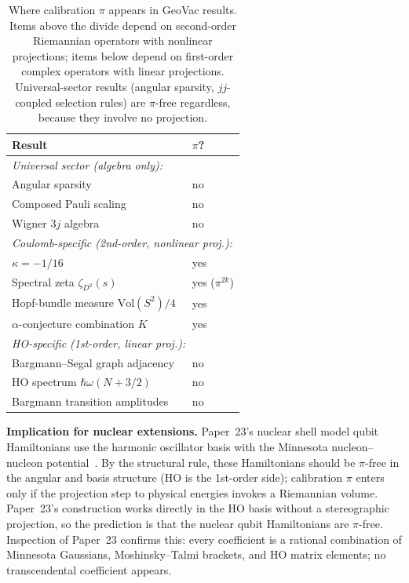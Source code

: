 \documentclass[twocolumn,pra,amsmath,amssymb,superscriptaddress]{revtex4-2}
\begin{document}
\begin{table}[h]
\caption{Where calibration $\pi$ appears in GeoVac results.  Items
above the divide depend on second-order Riemannian operators with
nonlinear projections; items below depend on first-order complex
operators with linear projections.  Universal-sector results (angular
sparsity, $jj$-coupled selection rules) are $\pi$-free regardless,
because they involve no projection.}
\label{tab:pi_distribution}
\begin{ruledtabular}
\begin{tabular}{ll}
Result & $\pi$? \\
\hline
\multicolumn{2}{l}{\emph{Universal sector (algebra only):}} \\
Angular sparsity~\cite{paper22} & no \\
Composed Pauli scaling~\cite{paper14} & no \\
Wigner $3j$ algebra & no \\
\hline
\multicolumn{2}{l}{\emph{Coulomb-specific (2nd-order, nonlinear proj.):}} \\
$\kappa = -1/16$~\cite{paper7} & yes \\
Spectral zeta $\zeta_{D^2}(s)$~\cite{paper28} & yes ($\pi^{2k}$) \\
Hopf-bundle measure $\mathrm{Vol}(S^2)/4$~\cite{paper2_alpha} & yes \\
$\alpha$-conjecture combination $K$~\cite{paper2_alpha} & yes \\
\hline
\multicolumn{2}{l}{\emph{HO-specific (1st-order, linear proj.):}} \\
Bargmann--Segal graph adjacency~\cite{paper24} & no \\
HO spectrum $\hbar\omega(N + 3/2)$ & no \\
Bargmann transition amplitudes & no \\
\end{tabular}
\end{ruledtabular}
\end{table}

\medskip\noindent\textbf{Implication for nuclear extensions.}
Paper~23's nuclear shell model qubit Hamiltonians use the harmonic
oscillator basis with the Minnesota nucleon--nucleon
potential~\cite{paper23}.  By the structural rule, these Hamiltonians
should be $\pi$-free in the angular and basis structure (HO is the
1st-order side); calibration $\pi$ enters only if the projection step
to physical energies invokes a Riemannian volume.  Paper~23's
construction works directly in the HO basis without a stereographic
projection, so the prediction is that the nuclear qubit Hamiltonians
are $\pi$-free.  Inspection of Paper~23 confirms this: every
coefficient is a rational combination of Minnesota Gaussians,
Moshinsky--Talmi brackets, and HO matrix elements; no transcendental
coefficient appears.
\end{document}
